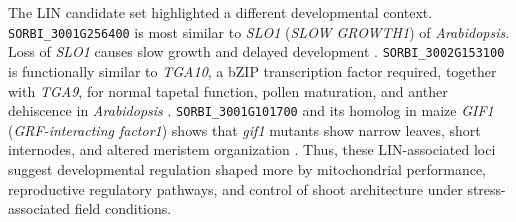 \documentclass[9pt,twocolumn,twoside]{rilabRxiv}
\begin{document}
The LIN candidate set highlighted a different developmental context. \texttt{SORBI\_3001G256400} is most similar to \textit{SLO1} (\textit{SLOW GROWTH1}) of \textit{Arabidopsis}. Loss of \textit{SLO1} causes slow growth and delayed development \citep{Sung2010}. \texttt{SORBI\_3002G153100} is functionally similar to \textit{TGA10}, a bZIP transcription factor required, together with \textit{TGA9}, for normal tapetal function, pollen maturation, and anther dehiscence in \textit{Arabidopsis} \citep{Murmu2010}. \texttt{SORBI\_3001G101700} and its homolog in maize \textit{GIF1} (\textit{GRF-interacting factor1}) shows that \textit{gif1} mutants show narrow leaves, short internodes, and altered meristem organization \citep{Zhang2018GIF1}. Thus, these LIN-associated loci suggest developmental regulation shaped more by mitochondrial performance, reproductive regulatory pathways, and control of shoot architecture under stress-associated field conditions.




\end{document}
